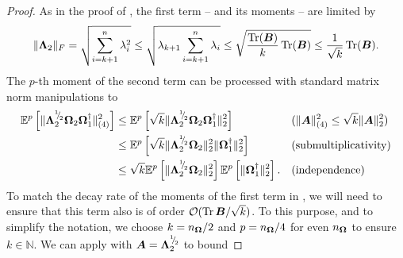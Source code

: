 \documentclass[12pt]{article}
\begin{document}
\begin{proof}
    As in the proof of \cite[lemma 3]{meyer-2021-hutch-optimal}, the first term -- and its moments -- are limited by
    \begin{equation}
        \lVert \boldsymbol{\Lambda}_2 \rVert _F
        = \sqrt{\sum_{i=k+1}^{n} \lambda_i^2}
        \leq \sqrt{ \lambda_{k+1} \sum_{i=k+1}^{n} \lambda_i}
        \leq \sqrt{ \frac{\operatorname{Tr}(\boldsymbol{B})}{k} \operatorname{Tr}(\boldsymbol{B})}
        \leq \frac{1}{\sqrt{k}} \operatorname{Tr}(\boldsymbol{B}).
        \label{equ:nystrom-proof-frobenius-trace}
    \end{equation}
    The $p$-th moment of the second term can be processed with standard matrix norm manipulations to
    \begin{align}
        \mathbb{E}^{p}\left[ \lVert \boldsymbol{\Lambda}_2^{{}^{1}{\mskip -5mu/\mskip -3mu}_{2}} \boldsymbol{\Omega}_2 \boldsymbol{\Omega}_1^{\dagger} \rVert _{(4)}^2 \right]
        &\leq \mathbb{E}^{p}\left[ \sqrt{k} \lVert \boldsymbol{\Lambda}_2^{{}^{1}{\mskip -5mu/\mskip -3mu}_{2}} \boldsymbol{\Omega}_2 \boldsymbol{\Omega}_1^{\dagger} \rVert _2^2 \right]  && \text{($\lVert \boldsymbol{A} \rVert _{(4)}^2 \leq \sqrt{k} \lVert \boldsymbol{A} \rVert _2^2$)} \notag \\
        &\leq \mathbb{E}^{p}\left[ \sqrt{k} \lVert \boldsymbol{\Lambda}_2^{{}^{1}{\mskip -5mu/\mskip -3mu}_{2}} \boldsymbol{\Omega}_2 \rVert _2^2 \lVert \boldsymbol{\Omega}_1^{\dagger} \rVert _2^2 \right]  && \text{(submultiplicativity)} \notag \\
        &\leq \sqrt{k} \mathbb{E}^{p}\left[ \lVert \boldsymbol{\Lambda}_2^{{}^{1}{\mskip -5mu/\mskip -3mu}_{2}} \boldsymbol{\Omega}_2 \rVert _2^2\right] \mathbb{E}^{p}\left[ \lVert \boldsymbol{\Omega}_1^{\dagger} \rVert _2^2  \right]. && \text{(independence)}
        \label{equ:nystrom-proof-processed-tail}
    \end{align}
    To match the decay rate of the moments of the first term in , we will need to ensure that this term also is of order $\mathcal{O}(\operatorname{Tr}{\boldsymbol{B}} / \sqrt{k})$. To this purpose, and to simplify the notation, we choose $k = n_{\boldsymbol{\Omega}}/2$ and $p = n_{\boldsymbol{\Omega}}/4$ for even $n_{\boldsymbol{\Omega}}$ to ensure $k \in \mathbb{N}$. We can apply  with $\boldsymbol{A} = \boldsymbol{\Lambda}_2^{{}^{1}{\mskip -5mu/\mskip -3mu}_{2}}$ to bound

\end{proof}
\end{document}
